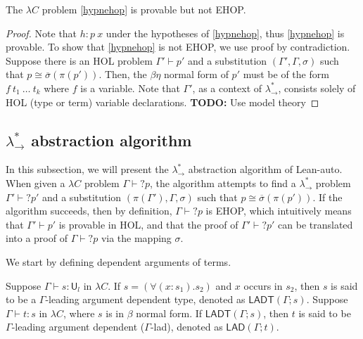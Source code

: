 \begin{theorem}
  The $\lambda C$ problem \eqref{hypnehop} is provable but not EHOP.
\end{theorem}
\begin{proof}
  Note that $h : p \ x$ under the hypotheses of \eqref{hypnehop}, thus \eqref{hypnehop} is provable.
  To show that \eqref{hypnehop} is not EHOP, we use proof by contradiction. Suppose there
  is an HOL problem $\Gamma' \vdash p'$ and a substitution $(\Gamma', \Gamma, \sigma)$ such
  that $p \cong \overline{\sigma}(\pi(p'))$. Then, the $\beta\eta$ normal form of $p'$ must be of the form
  $f \ t_1 \ \dots \ t_k$ where $f$ is a variable. Note that $\Gamma'$, as a context of $\lambda_\to^*$,
  consists solely of HOL (type or term) variable declarations. \textbf{TODO:} Use model theory
\end{proof}

\subsection{$\lambda_\to^*$ abstraction algorithm}

In this subsection, we will present the $\lambda_\to^*$ abstraction algorithm of Lean-auto. When given a
$\lambda C$ problem $\Gamma \vdash? p$, the algorithm attempts to find a $\lambda_\to^*$
problem $\Gamma' \vdash? p'$ and a substitution $(\pi(\Gamma'), \Gamma, \sigma)$ such that
$p \cong \overline{\sigma}(\pi(p'))$. If the algorithm succeeds, then by definition, $\Gamma \vdash? p$
is EHOP, which intuitively means that $\Gamma' \vdash p'$ is provable in HOL, and that the
proof of $\Gamma' \vdash? p'$ can be translated into a proof of $\Gamma \vdash? p$ via
the mapping $\sigma$.

\noindent We start by defining dependent arguments of terms.

\begin{definition} Suppose $\Gamma \vdash s : \mathsf{U}_l$ in $\lambda C$.
  If $s = (\forall (x : s_1). s_2)$ and $x$ occurs in $s_2$,
  then $s$ is said to be a $\Gamma$-leading argument dependent type,
  denoted as $\mathsf{LADT}(\Gamma; s)$. Suppose $\Gamma \vdash t : s$ in $\lambda C$, where $s$
  is in $\beta$ normal form. If $\mathsf{LADT}(\Gamma; s)$, then $t$ is said to be
  $\Gamma$-leading argument dependent ($\Gamma$-lad), denoted as $\mathsf{LAD}(\Gamma; t)$.
\end{definition}

